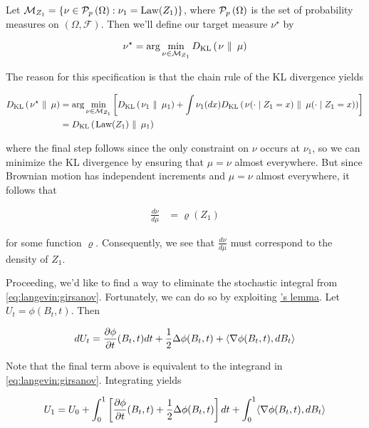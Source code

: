 Let $\mathcal{M}_{Z_1} = \{\nu\in\mathcal{P}_{p}\left(\Omega\right) : \nu_1 =
\text{Law}(Z_1)\}$, where $\mathcal{P}_{p}\left(\Omega\right)$ is the set of
probability measures on $(\Omega, \mathcal{F})$. Then we'll define our
target measure $\nu^\star$ by

\begin{align*}
  \nu^\star = \arg\min_{\nu\in\mathcal{M}_{Z_1}}D_{\text{KL}}\left(\left. \nu\ \right\|\ \mu\right)
\end{align*}

The reason for this specification is that the chain rule of the KL
divergence yields

\begin{align*}
  D_{\text{KL}}\left(\left. \nu^\star\ \right\|\ \mu\right) &=
                        \arg\min_{\nu\in\mathcal{M}_{Z_1}}\left[D_{\text{KL}}\left(\left. \nu_1\ \right\|\ \mu_1\right)
                        + \int\nu_1(dx)D_{\text{KL}}\left(\left. \nu(\cdot\mid
                        Z_1=x)\ \right\|\ \mu(\cdot\mid Z_1=x)\right)\right]\\
  &= D_{\text{KL}}\left(\left. \text{Law}(Z_1)\ \right\|\ \mu_1\right)
\end{align*}

where the final step follows since the only constraint on $\nu$ occurs
at $\nu_1$, so we can minimize the KL divergence by ensuring that
$\mu=\nu$ almost everywhere. But since Brownian motion has independent
increments and $\mu=\nu$ almost everywhere, it follows that

\begin{align*}
  \frac{d\nu}{d\mu} &= \varrho(Z_1)
\end{align*}

for some function $\varrho$. Consequently, we see that
$\frac{d\nu}{d\mu}$ must correspond to the density of $Z_1$.

Proceeding, we'd like to find a way to eliminate the stochastic
integral from \eqref{eq:langevin:girsanov}. Fortunately, we can do so
by exploiting \hyperref[app:ito]{\Ito's lemma}. Let  $U_t = \phi(B_t,
t)$. Then

\begin{align*}
  dU_t &= \frac{\partial \phi}{\partial t}(B_t, t)dt + \frac{1}{2}\Delta\phi(B_t, t) +
         \langle\nabla\phi(B_t, t), dB_t\rangle\\
\end{align*}

Note that the final term above is equivalent to the integrand in
\eqref{eq:langevin:girsanov}. Integrating yields

\begin{align*}
  U_1 &= U_0 + \int_0^1\left[\frac{\partial \phi}{\partial t}(B_t, t) +
        \frac{1}{2}\Delta\phi(B_t, t)\right]dt + 
        \int_0^1\langle\nabla\phi(B_t, t), dB_t\rangle\\
\end{align*}


